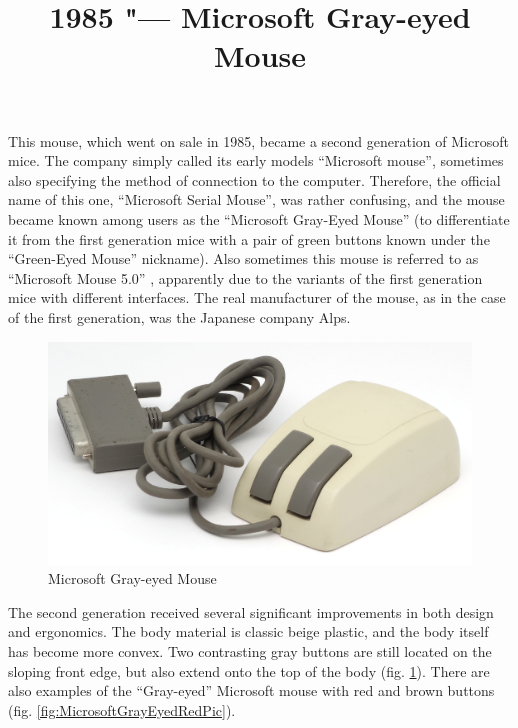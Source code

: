 \documentclass[11pt, a4paper]{article}
\begin{document}
\title{1985 "--- Microsoft Gray-eyed Mouse}
\date{}
\maketitle
{}

This mouse, which went on sale in 1985, became a second generation of Microsoft mice. The company simply called its early models ``Microsoft mouse'', sometimes also specifying the method of connection to the computer. Therefore, the official name of this one, ``Microsoft Serial Mouse'', was rather confusing, and the mouse became known among users as the ``Microsoft Gray-Eyed Mouse'' (to differentiate it from the first generation mice with a pair of green buttons known under the ``Green-Eyed Mouse'' nickname). Also sometimes this mouse is referred to as ``Microsoft Mouse 5.0'' \cite{mouses}, apparently due to the variants of the first generation mice with different interfaces.
The real manufacturer of the mouse, as in the case of the first generation, was the Japanese company Alps.

\begin{figure}[h]
   \centering
    \includegraphics[scale=0.45]{1985_microsoft_gray_eyed_mouse/pic_30.jpg}
    \caption{Microsoft Gray-eyed Mouse}
    \label{fig:MicrosoftGrayEyedPic}
\end{figure}

The second generation received several significant improvements in both design and ergonomics. The body material is classic beige plastic, and the body itself has become more convex. Two contrasting gray buttons are still located on the sloping front edge, but also extend onto the top of the body (fig. \ref{fig:MicrosoftGrayEyedPic}). There are also examples of the ``Gray-eyed'' Microsoft mouse with red and brown buttons (fig.  \ref{fig:MicrosoftGrayEyedRedPic}).
\end{document}
